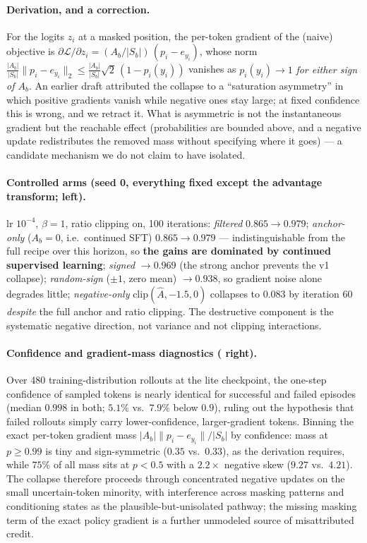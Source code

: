 \documentclass{article}
\begin{document}
\paragraph{Derivation, and a correction.} For the logits $z_i$ at a masked position, the
per-token gradient of the (naive) objective is
$\partial \mathcal{L}/\partial z_i = (A_b/|S_b|)\,(p_i - e_{y_i})$, whose norm
$\tfrac{|A_b|}{|S_b|}\lVert p_i - e_{y_i}\rVert_2 \le \tfrac{|A_b|}{|S_b|}\sqrt{2}\,(1-p_i(y_i))$
vanishes as $p_i(y_i)\!\to\!1$ \emph{for either sign of $A_b$}. An earlier draft attributed the
collapse to a ``saturation asymmetry'' in which positive gradients vanish while negative ones stay
large; at fixed confidence this is wrong, and we retract it. What is asymmetric is not the
instantaneous gradient but the reachable effect (probabilities are bounded above, and a negative
update redistributes the removed mass without specifying where it goes) --- a candidate mechanism we
do not claim to have isolated.

\paragraph{Controlled arms (seed 0, everything fixed except the advantage transform;
 left).} lr $10^{-4}$, $\beta{=}1$, ratio clipping on, 100 iterations:
\emph{filtered} $0.865\!\to\!0.979$; \emph{anchor-only} ($A_b{=}0$, i.e.\ continued SFT)
$0.865\!\to\!0.979$ --- indistinguishable from the full recipe over this horizon, so
\textbf{the gains are dominated by continued supervised learning}; \emph{signed}
$\to 0.969$ (the strong anchor prevents the v1 collapse); \emph{random-sign} ($\pm1$, zero mean)
$\to 0.938$, so gradient noise alone degrades little; \emph{negative-only}
$\mathrm{clip}(\hat{A},-1.5,0)$ collapses to $0.083$ by iteration 60 \emph{despite} the full anchor
and ratio clipping. The destructive component is the systematic negative direction, not variance and
not clipping interactions.

\paragraph{Confidence and gradient-mass diagnostics ( right).} Over 480
training-distribution rollouts at the lite checkpoint, the one-step confidence of sampled tokens is
nearly identical for successful and failed episodes (median $0.998$ in both; $5.1\%$ vs.\ $7.9\%$
below $0.9$), ruling out the hypothesis that failed rollouts simply carry lower-confidence,
larger-gradient tokens. Binning the exact per-token gradient mass
$|A_b|\lVert p_i-e_{y_i}\rVert/|S_b|$ by confidence: mass at $p\ge0.99$ is tiny and sign-symmetric
($0.35$ vs.\ $0.33$), as the derivation requires, while $75\%$ of all mass sits at $p<0.5$ with a
$2.2\times$ negative skew ($9.27$ vs.\ $4.21$). The collapse therefore proceeds through concentrated
negative updates on the small uncertain-token minority, with interference across masking patterns and
conditioning states as the plausible-but-unisolated pathway; the missing masking term of the exact
policy gradient \citep{raajesh2026maskaware} is a further unmodeled source of misattributed credit.
\end{document}
